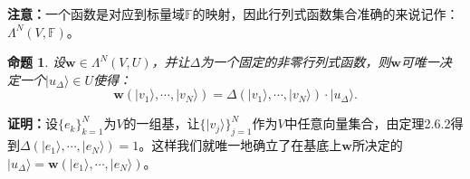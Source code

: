 \documentclass[mathserif,hyperref,UTF8,openany,b5paper]{ctexbook}
\newtheorem{pro}{命题}[section]
\begin{document}
\textbf{注意：}一个函数是对应到标量域$\mathbb{F}$的映射，因此行列式函数集合准确的来说记作：$\boxed{\Lambda^N(V,\mathbb{F})}$。
\begin{pro}
设$\mathbf{w}\in\Lambda^N(V,U)$，并让$\Delta$为一个固定的非零行列式函数，则$\mathbf{w}$可唯一决定一个$|u_\Delta\rangle\in U$使得：
\begin{equation}
\mathbf{w}(|v_1\rangle,\cdots,|v_N\rangle)=\Delta(|v_1\rangle,\cdots,|v_N\rangle)\cdot|u_\Delta\rangle.
\end{equation}
\end{pro}
\textbf{证明：}设$\{e_k\}^N_{k=1}$为$V$的一组基，让$\{|v_j\rangle\}^N_{j=1}$作为$V$中任意向量集合，由定理2.6.2得到$\Delta(|e_1\rangle,\cdots,|e_N\rangle)=1$。这样我们就唯一地确立了在基底上$\mathbf{w}$所决定的$|u_\Delta\rangle=\mathbf{w}(|e_1\rangle,\cdots,|e_N\rangle)$。
\end{document}
